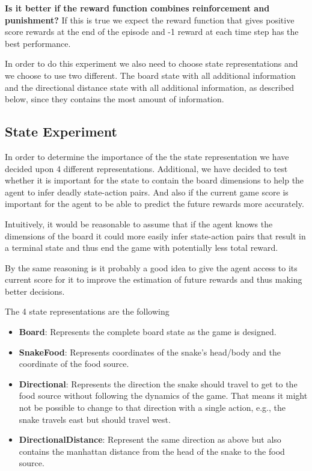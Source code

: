 \documentclass[report.tex]{subfiles}
\begin{document}
    \textbf{Is it better if the reward function combines reinforcement and punishment?} If this is true we expect the reward function that gives positive score rewards at the end of the episode and -1 reward at each time step has the best performance.

    In order to do this experiment we also need to choose state representations and we choose to use two different. The board state with all additional information and the directional distance state with all additional information, as described below, since they contains the most amount of information.

    \subsection*{State Experiment}

    In order to determine the importance of the the state representation we have decided upon 4 different representations. Additional, we have decided to test whether it is important for the state to contain the board dimensions to help the agent to infer deadly state-action pairs. And also if the current game score is important for the agent to be able to predict the future rewards more accurately.

    Intuitively, it would be reasonable to assume that if the agent knows the dimensions of the board it could more easily infer state-action pairs that result in a terminal state and thus end the game with potentially less total reward.

    By the same reasoning is it probably a good idea to give the agent access to its current score for it to improve the estimation of future rewards and thus making better decisions.

    The 4 state representations are the following

    \begin{itemize}
        \item \textbf{Board}: Represents the complete board state as the game is designed.
        \item \textbf{SnakeFood}: Represents coordinates of the snake's head/body and the coordinate of the food source.
        \item \textbf{Directional}: Represents the direction the snake should travel to get to the food source without following the dynamics of the game. That means it might not be possible to change to that direction with a single action, e.g., the snake travels east but should travel west.
        \item \textbf{DirectionalDistance}: Represent the same direction as above but also contains the manhattan distance from the head of the snake to the food source.
    \end{itemize}
\end{document}
